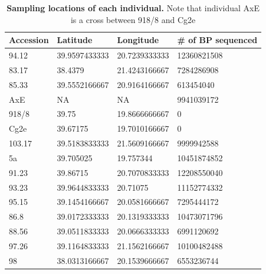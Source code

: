 \begin{table}[ht!]
\centering
\begin{tabular}{l l l l} 
 \hline
 Accession & Latitude & Longitude & \# of BP sequenced \\ [0.5ex] 
 \hline
94.12	& 39.9597433333	& 20.7239333333	& 12360821508 \\
83.17	& 38.4379	& 21.4243166667	& 7284286908 \\
85.33	& 39.5552166667	& 20.9164166667	& 613454040 \\
AxE	& NA	& NA	& 9941039172 \\
918/8	& 39.75	& 19.8666666667	& 0 \\
Cg2e	& 39.67175	& 19.7010166667	& 0 \\
103.17	& 39.5183833333	& 21.5609166667	& 9999942588 \\
5a	& 39.705025	& 19.757344	& 10451874852 \\
91.23	& 39.86715	& 20.7070833333	& 12208550040 \\
93.23	& 39.9644833333	& 20.71075	& 11152774332 \\
95.15	& 39.1454166667	& 20.0581666667	& 7295444172 \\
86.8	& 39.0172333333	& 20.1319333333	& 10473071796 \\
88.56	& 39.0511833333	& 20.0666333333	& 6991120692 \\
97.26	& 39.1164833333	& 21.1562166667	& 10100482488 \\
98	& 38.0313166667	& 20.1539666667	& 6553236744 \\ [1ex] 
 \hline
\end{tabular}
\caption{\textbf{Sampling locations of each individual.} Note that individual AxE is a cross between 918/8 and Cg2e}
\label{table:s1}
\end{table}


